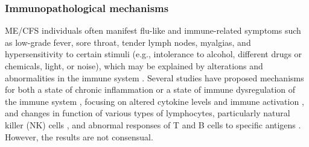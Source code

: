 \subsubsection{Immunopathological mechanisms}

ME/CFS individuals often manifest flu-like and immune-related symptoms such as low-grade fever, sore throat, tender lymph nodes, myalgias, and hypersensitivity to certain stimuli (e.g., intolerance to alcohol, different drugs or chemicals, light, or noise), which may be explained by alterations and abnormalities in the immune system \citep{underhill2015MyalgicEncephalomyelitis}.
Several studies have proposed mechanisms for both a state of chronic inflammation 
or a state of immune dysregulation of the immune system 
\citep{natelson2002EvidencePresence, brenuImmunologicalAbnormalitiesPotential2011}, focusing on altered cytokine levels and immune activation \citep{patarca2001CytokinesChronic, tomoda2005CytokineProduction, lorussoImmunologicalAspectsChronic2009}, and changes in function of various types of lymphocytes, particularly natural killer (NK) cells \citep{klimas1990ImmunologicAbnormalitiesa}, and abnormal responses of T and B cells to specific antigens \citep{lorussoImmunologicalAspectsChronic2009, brenu2014RoleAdaptive, rivasAssociationNKCell2018}.
However, the results are not consensual.


